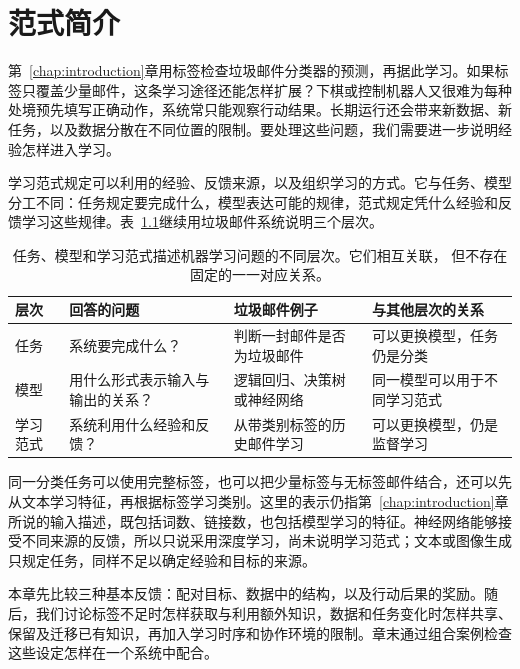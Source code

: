 \chapter{范式简介}
\label{chap:machine-learning-paradigms}

第~\ref{chap:introduction}章用标签检查垃圾邮件分类器的预测，再据此学习。如果标签只覆盖少量邮件，这条学习途径还能怎样扩展？下棋或控制机器人又很难为每种处境预先填写正确动作，系统常只能观察行动结果。长期运行还会带来新数据、新任务，以及数据分散在不同位置的限制。要处理这些问题，我们需要进一步说明经验怎样进入学习。

学习范式规定可以利用的经验、反馈来源，以及组织学习的方式。它与任务、模型分工不同：任务规定要完成什么，模型表达可能的规律，范式规定凭什么经验和反馈学习这些规律。表~\ref{tab:task-paradigm-model}继续用垃圾邮件系统说明三个层次。

\begin{table}[htbp]
  \centering
  \small
  \begin{tabularx}{\linewidth}{@{}lXXX@{}}
    \toprule
    \textbf{层次} & \textbf{回答的问题} & \textbf{垃圾邮件例子} & \textbf{与其他层次的关系} \\
    \midrule
    任务 & 系统要完成什么？ & 判断一封邮件是否为垃圾邮件 & 可以更换模型，任务仍是分类 \\
    模型 & 用什么形式表示输入与输出的关系？ & 逻辑回归、决策树或神经网络 & 同一模型可以用于不同学习范式 \\
    学习范式 & 系统利用什么经验和反馈？ & 从带类别标签的历史邮件学习 & 可以更换模型，仍是监督学习 \\
    \bottomrule
  \end{tabularx}
  \caption{任务、模型和学习范式描述机器学习问题的不同层次。它们相互关联，
  但不存在固定的一一对应关系。}
  \label{tab:task-paradigm-model}
\end{table}
\FloatBarrier

同一分类任务可以使用完整标签，也可以把少量标签与无标签邮件结合，还可以先从文本学习特征，再根据标签学习类别。这里的表示仍指第~\ref{chap:introduction}章所说的输入描述，既包括词数、链接数，也包括模型学习的特征。神经网络能够接受不同来源的反馈，所以只说采用深度学习，尚未说明学习范式；文本或图像生成只规定任务，同样不足以确定经验和目标的来源。

本章先比较三种基本反馈：配对目标、数据中的结构，以及行动后果的奖励。随后，我们讨论标签不足时怎样获取与利用额外知识，数据和任务变化时怎样共享、保留及迁移已有知识，再加入学习时序和协作环境的限制。章末通过组合案例检查这些设定怎样在一个系统中配合。

